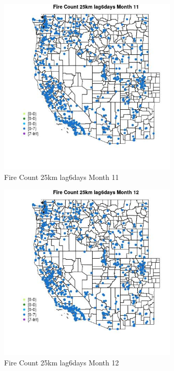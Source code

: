 \begin{figure} 
\centering  
\includegraphics[width=0.77\textwidth]{Code_Outputs/Report_ML_input_PM25_Step4_part_e_de_duplicated_aves_compiled_2019-05-21wNAs_MapObsMo11Fire_Count_25km_lag6days.jpg} 
\caption{\label{fig:Report_ML_input_PM25_Step4_part_e_de_duplicated_aves_compiled_2019-05-21wNAsMapObsMo11Fire_Count_25km_lag6days}Fire Count 25km lag6days Month 11} 
\end{figure} 
 

\begin{figure} 
\centering  
\includegraphics[width=0.77\textwidth]{Code_Outputs/Report_ML_input_PM25_Step4_part_e_de_duplicated_aves_compiled_2019-05-21wNAs_MapObsMo12Fire_Count_25km_lag6days.jpg} 
\caption{\label{fig:Report_ML_input_PM25_Step4_part_e_de_duplicated_aves_compiled_2019-05-21wNAsMapObsMo12Fire_Count_25km_lag6days}Fire Count 25km lag6days Month 12} 
\end{figure} 
 

